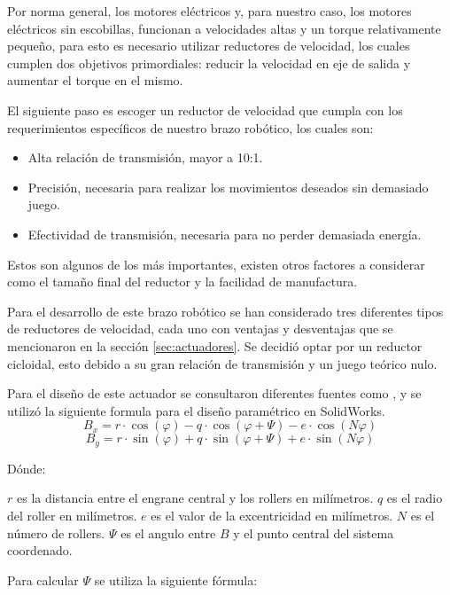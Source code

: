 Por norma general, los motores eléctricos y, para nuestro caso, los motores eléctricos sin escobillas, funcionan a velocidades altas y un torque relativamente pequeño, para esto es necesario utilizar reductores de velocidad, los cuales cumplen dos objetivos primordiales: reducir la velocidad en eje de salida y aumentar el torque en el mismo.

El siguiente paso es escoger un reductor de velocidad que cumpla con los requerimientos específicos de nuestro brazo robótico, los cuales son:

\begin{itemize}
\itemsep0em
\item Alta relación de transmisión, mayor a 10:1.
\item Precisión, necesaria para realizar los movimientos deseados sin demasiado juego. 
\item Efectividad de transmisión, necesaria para no perder demasiada energía.
\end{itemize}

Estos son algunos de los más importantes, existen otros factores a considerar como el tamaño final del reductor y la facilidad de manufactura.

Para el desarrollo de este brazo robótico se han considerado tres diferentes tipos de reductores de velocidad, cada uno con ventajas y desventajas que se mencionaron en la sección \ref{sec:actuadores}. Se decidió optar por un reductor cicloidal, esto debido a su gran relación de transmisión y un juego teórico nulo.  

Para el diseño de este actuador se consultaron diferentes fuentes como \cite{Lei2012} \cite{Nachimowicz2016}, y se utilizó la siguiente formula para el diseño paramétrico en SolidWorks.
\begin{equation}
B_x = r  \cdot \cos(\varphi) - q \cdot \cos(\varphi + \Psi) - e \cdot \cos(N\varphi)
\end{equation}
\begin{equation}
B_y = r  \cdot \sin(\varphi) + q \cdot \sin(\varphi + \Psi) + e \cdot \sin(N\varphi)
\end{equation}

Dónde:

$r$ es la distancia entre el engrane central y los rollers en milímetros.
$q$ es el radio del roller en milímetros.
$e$ es el valor de la excentricidad en milímetros.
$N$ es el número de rollers.
$\Psi$ es el angulo entre $B$ y el punto central del sistema coordenado.

Para calcular $\Psi$ se utiliza la siguiente fórmula:

